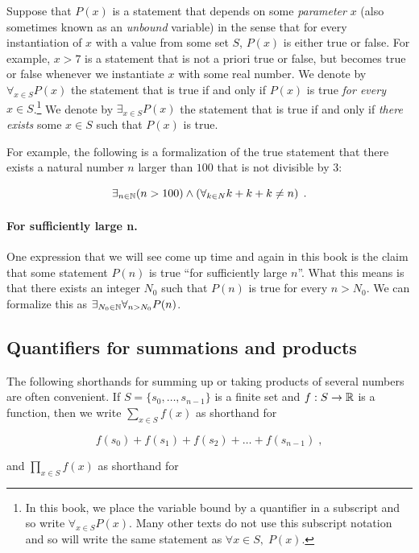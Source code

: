 Suppose that \(P(x)\) is a statement that depends on some
\emph{parameter} \(x\) (also sometimes known as an \emph{unbound}
variable) in the sense that for every instantiation of \(x\) with a
value from some set \(S\), \(P(x)\) is either true or false. For
example, \(x>7\) is a statement that is not a priori true or false, but
becomes true or false whenever we instantiate \(x\) with some real
number. We denote by \(\forall_{x\in S} P(x)\) the statement that is
true if and only if \(P(x)\) is true \emph{for every}
\(x\in S\).\footnote{In this book, we place the variable bound by a
  quantifier in a subscript and so write \(\forall_{x\in S}P(x)\). Many
  other texts do not use this subscript notation and so will write the
  same statement as \(\forall x\in S, \; P(x)\).} We denote by
\(\exists_{x\in S} P(x)\) the statement that is true if and only if
\emph{there exists} some \(x\in S\) such that \(P(x)\) is true.

For example, the following is a formalization of the true statement that
there exists a natural number \(n\) larger than \(100\) that is not
divisible by \(3\):

\[
\exists_{n\in {\mathbb{N}}} (n>100) \wedge \left(\forall_{k\in N} k+k+k \neq n\right) \;.
\]

\paragraph{For sufficiently large n.} One expression that we will see
come up time and again in this book is the claim that some statement
\(P(n)\) is true ``for sufficiently large \(n\)''. What this means is
that there exists an integer \(N_0\) such that \(P(n)\) is true for
every \(n>N_0\). We can formalize this as
\(\exists_{N_0\in {\mathbb{N}}} \forall_{n>N_0} P(n)\).

\subsection{Quantifiers for summations and
products}\label{secquantifierssums}

The following shorthands for summing up or taking products of several
numbers are often convenient. If \(S = \{s_0,\ldots,s_{n-1} \}\) is a
finite set and \(f:S \rightarrow {\mathbb{R}}\) is a function, then we write
\(\sum_{x\in S} f(x)\) as shorthand for

\[
f(s_0) + f(s_1) + f(s_2) + \ldots + f(s_{n-1}) \;,
\]

and \(\prod_{x\in S} f(x)\) as shorthand for

